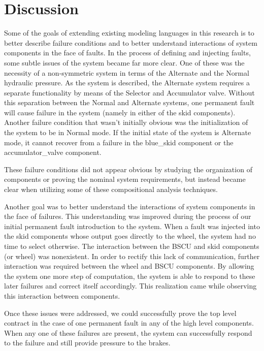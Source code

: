 \section{Discussion}
Some of the goals of extending existing modeling languages in this research is to better describe failure conditions and to better understand interactions of system components in the face of faults. In the process of defining and injecting faults, some subtle issues of the system became far more clear. One of these was the necessity of a non-symmetric system in terms of the Alternate and the Normal hydraulic pressure. As the system is described, the Alternate system requires a separate functionality by means of the Selector and Accumulator valve. Without this separation between the Normal and Alternate systems, one permanent fault will cause failure in the system (namely in either of the skid components). Another failure condition that wasn't initially obvious was the initialization of the system to be in Normal mode. If the initial state of the system is Alternate mode, it cannot recover from a failure in the blue\_skid component or the accumulator\_valve component. 

These failure conditions did not appear obvious by studying the organization of components or proving the nominal system requirements, but instead became clear when utilizing some of these compositional analysis techniques. 

Another goal was to better understand the interactions of system components in the face of failures. This understanding was improved during the process of our initial permanent fault introduction to the system. When a fault was injected into the skid components whose output goes directly to the wheel, the system had no time to select otherwise. The interaction between the BSCU and skid components (or wheel) was nonexistent. In order to rectify this lack of communication, further interaction was required between the wheel and BSCU components. By allowing the system one more step of computation, the system is able to respond to these later failures and correct itself accordingly. This realization came while observing this interaction between components.

Once these issues were addressed, we could successfully prove the top level contract in the case of one permanent fault in any of the high level components. When any one of these failures are present, the system can successfully respond to the failure and still provide pressure to the brakes. 




